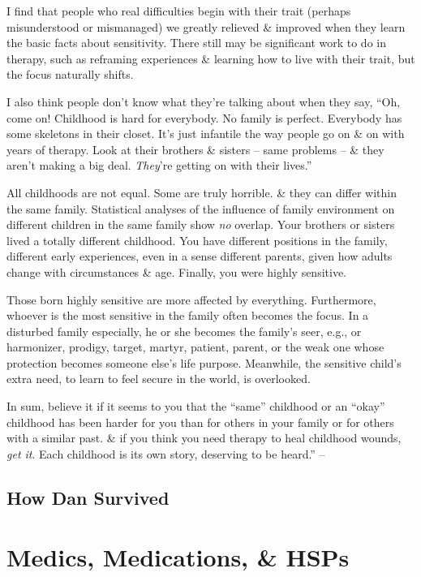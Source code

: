 \documentclass{article}
\numberwithin{equation}{section}
\begin{document}
I find that people who real difficulties begin with their trait (perhaps misunderstood or mismanaged) we greatly relieved \& improved when they learn the basic facts about sensitivity. There still may be significant work to do in therapy, such as reframing experiences \& learning how to live with their trait, but the focus naturally shifts.

I also think people don't know what they're talking about when they say, ``Oh, come on! Childhood is hard for everybody. No family is perfect. Everybody has some skeletons in their closet. It's just infantile the way people go on \& on with years of therapy. Look at their brothers \& sisters -- same problems -- \& they aren't making a big deal. \textit{They}'re getting on with their lives.''

All childhoods are not equal. Some are truly horrible. \& they can differ within the same family. Statistical analyses of the influence of family environment on different children in the same family show \textit{no} overlap. Your brothers or sisters lived a totally different childhood. You have different positions in the family, different early experiences, even in a sense different parents, given how adults change with circumstances \& age. Finally, you were highly sensitive.

Those born highly sensitive are more affected by everything. Furthermore, whoever is the most sensitive in the family often becomes the focus. In a disturbed family especially, he or she becomes the family's seer, e.g., or harmonizer, prodigy, target, martyr, patient, parent, or the weak one whose protection becomes someone else's life purpose. Meanwhile, the sensitive child's extra need, to learn to feel secure in the world, is overlooked.

In sum, believe it if it seems to you that the ``same'' childhood or an ``okay'' childhood has been harder for you than for others in your family or for others with a similar past. \& if you think you need therapy to heal childhood wounds, \textit{get it}. Each childhood is its own story, deserving to be heard.'' -- \cite[pp. 199--201]{Aron2013}

\subsection{How Dan Survived}


\section{Medics, Medications, \& HSPs}
\end{document}
